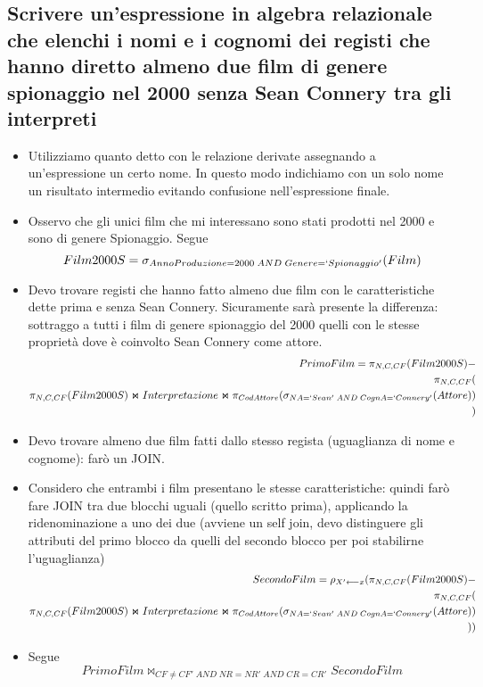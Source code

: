 \subsection*{Scrivere un'espressione in algebra relazionale che elenchi i nomi e i cognomi dei registi che hanno diretto almeno due film di genere spionaggio nel 2000 senza Sean Connery tra gli interpreti}
\begin{itemize}
	\item Utilizziamo quanto detto con le relazione derivate assegnando a un'espressione un certo nome. In questo modo indichiamo con un solo nome un risultato intermedio evitando confusione nell'espressione finale.
	\item Osservo che gli unici film che mi interessano sono stati prodotti nel 2000 e sono di genere Spionaggio. Segue
	\[Film2000S = \sigma_{AnnoProduzione = 2000\;AND\;Genere = `Spionaggio'}(Film)\]
	\item Devo trovare registi che hanno fatto almeno due film con le caratteristiche dette prima e senza Sean Connery. Sicuramente sarà presente la differenza: sottraggo a tutti i film di genere spionaggio del 2000 quelli con le stesse proprietà dove è coinvolto Sean Connery come attore.
	\begin{align*}PrimoFilm = \pi_{N,C,CF}(Film2000S) -\\
		\pi_{N,C,CF}(\\
		\pi_{N,C,CF}(Film2000S) \Join Interpretazione \Join \pi_{CodAttore}( \sigma_{NA = `Sean'\;AND\;CognA = `Connery'}(Attore))
		\\)\end{align*}
	\item Devo trovare almeno due film fatti dallo stesso regista (uguaglianza di nome e cognome): farò un JOIN.
	\item Considero che entrambi i film presentano le stesse caratteristiche: quindi farò fare JOIN tra due blocchi uguali (quello scritto prima), applicando la ridenominazione a uno dei due (avviene un self join, devo distinguere gli attributi del primo blocco da quelli del secondo blocco per poi stabilirne l'uguaglianza)
	\begin{align*}SecondoFilm = \rho_{X' \longleftarrow x}(\pi_{N,C,CF}(Film2000S) -\\
		\pi_{N,C,CF}(\\
		\pi_{N,C,CF}(Film2000S) \Join Interpretazione \Join \pi_{CodAttore}( \sigma_{NA = `Sean'\;AND\;CognA = `Connery'}(Attore))
		\\))\end{align*}
	\item Segue
	\[PrimoFilm \Join_{CF \neq CF'\;AND\;NR=NR'\;AND\;CR=CR'}SecondoFilm\]
\end{itemize}
